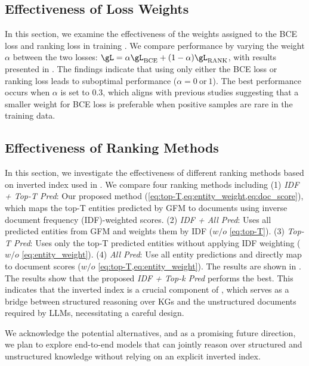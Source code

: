 \subsection{Effectiveness of Loss Weights}\label{app:loss_weight}
In this section, we examine the effectiveness of the weights assigned to the BCE loss and ranking loss in training \ourmethod. We compare performance by varying the weight $\alpha$ between the two losses: $\gL=\alpha\gL_{\text{BCE}} + (1-\alpha)\gL_{\text{RANK}}$, with results presented in . The findings indicate that using only either the BCE loss or ranking loss leads to suboptimal performance ($\alpha=0~\text{or}~1$). The best performance occurs when $\alpha$ is set to 0.3, which aligns with previous studies \citep{lin2024understanding} suggesting that a smaller weight for BCE loss is preferable when positive samples are rare in the training data.



\subsection{Effectiveness of Ranking Methods}\label{app:ranking_method}
In this section, we investigate the effectiveness of different ranking methods based on inverted index used in \ourmethod. We compare four ranking methods including (1) \emph{IDF + Top-T Pred}: Our proposed method (\cref{eq:top-T,eq:entity_weight,eq:doc_score}), which maps the top-T entities predicted by GFM to documents using inverse document frequency (IDF)-weighted scores. (2) \emph{IDF + All Pred}: Uses all predicted entities from GFM and weights them by IDF ($w/o$ \cref{eq:top-T}). (3) \emph{Top-T Pred}: Uses only the top-T predicted entities without applying IDF weighting ($w/o$ \cref{eq:entity_weight}). (4) \emph{All Pred}: Use all entity predictions and directly map to document scores ($w/o$ \cref{eq:top-T,eq:entity_weight}). The results are shown in . The results show that the proposed \emph{IDF + Top-k Pred} performs the best. This indicates that the inverted index is a crucial component of \ourmethod, which serves as a bridge between structured reasoning over KGs and the unstructured documents required by LLMs, necessitating a careful design.

We acknowledge the potential alternatives, and as a promising future direction, we plan to explore end-to-end models that can jointly reason over structured and unstructured knowledge without relying on an explicit inverted index.


